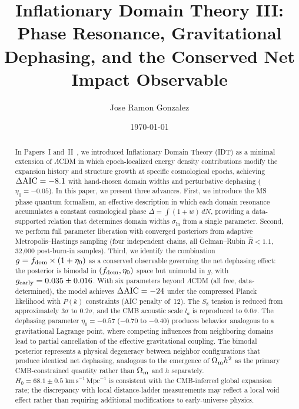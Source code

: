 \documentclass[aps,prd,twocolumn,superscriptaddress,nofootinbib]{revtex4-2}
\newcommand{\Om}{\Omega_{\rm m}}
\newcommand{\fdom}{f_{\rm dom}}
\newcommand{\sln}{\sigma_{\ln}}
\newcommand{\Hubble}{H_0}
\newcommand{\dAIC}{\Delta{\rm AIC}}
\newcommand{\gearly}{g_{\rm early}}
\newcommand{\etaz}{\eta_0}
\newcommand{\Rhat}{\hat{R}}
\begin{document}
\title{Inflationary Domain Theory III: Phase Resonance, Gravitational Dephasing, and the Conserved Net Impact Observable}

\author{Jose Ramon Gonzalez}

\date{\today}

\begin{abstract}
In Papers~I and~II~\cite{Paper1,Paper2}, we introduced Inflationary
Domain Theory (IDT) as a minimal extension of $\Lambda$CDM in which
epoch-localized energy density contributions modify the expansion
history and structure growth at specific cosmological epochs, achieving
$\dAIC = -8.1$ with hand-chosen domain widths and perturbative
dephasing ($\etaz = -0.05$). In this paper, we present three advances.
First, we introduce the MS phase quantum formalism, an effective
description in which each domain resonance accumulates a constant
cosmological phase $\Delta = \int(1+w)\,dN$, providing a
data-supported relation that determines domain widths $\sln$ from a
single parameter. Second, we perform full parameter liberation with
converged posteriors from adaptive Metropolis--Hastings sampling (four
independent chains, all Gelman--Rubin $\Rhat < 1.1$, 32{,}000
post-burn-in samples). Third, we identify the combination
$g = \fdom \times (1 + \etaz)$ as a conserved observable governing the
net dephasing effect: the posterior is bimodal in $(\fdom, \etaz)$
space but unimodal in $g$, with $\gearly = 0.035 \pm 0.016$. With six
parameters beyond $\Lambda$CDM (all free, data-determined), the model
achieves $\dAIC = -24$ under the compressed Planck likelihood with
$P(k)$ constraints (AIC penalty of~12). The $S_8$ tension is reduced
from approximately $3\sigma$ to $0.2\sigma$, and the CMB acoustic
scale $l_a$ is reproduced to $0.0\sigma$. The dephasing parameter
$\etaz = -0.57$ ($-0.70$ to $-0.40$) produces behavior analogous to a
gravitational Lagrange point, where competing influences from
neighboring domains lead to partial cancellation of the effective
gravitational coupling. The bimodal posterior represents a physical
degeneracy between neighbor configurations that produce identical net
dephasing, analogous to the emergence of $\Om h^2$ as the primary
CMB-constrained quantity rather than $\Om$ and $h$ separately.
$\Hubble = 68.1 \pm 0.5\;\mathrm{km\,s^{-1}\,Mpc^{-1}}$ is
consistent with the CMB-inferred global expansion rate; the
discrepancy with local distance-ladder measurements may reflect a
local void effect rather than requiring additional modifications to
early-universe physics.
\end{abstract}
\end{document}
